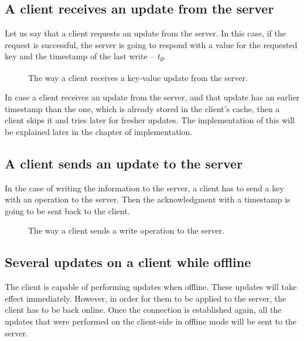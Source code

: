 \subsection{A client receives an update from the server}

Let us say that a client requests an update from the server. In this case, if the request is successful, the server is going to respond with a value for the requested key and the timestamp of the last write -- \textit{t\textsubscript{0}}.

\begin{figure}[!htb]
    \begin{center}
    \def\svgwidth{\linewidth}
    
    \caption {The way a client receives a key-value update from the server.}
    \label{fig:design2}
\end{center}
\end{figure}

In case a client receives an update from the server, and that update has an earlier timestamp than the one, which is already stored in the client's cache, then a client skips it and tries later for fresher updates. The implementation of this will be explained later in the chapter of implementation.

\subsection{A client sends an update to the server}

In the case of writing the information to the server, a client has to send a key with an operation to the server. Then the acknowledgment with a timestamp is going to be sent back to the client.

\begin{figure}[!htb]
    \begin{center}
    \def\svgwidth{\linewidth}
    
    \caption {The way a client sends a write operation to the server.}
    \label{fig:design3}
\end{center}
\end{figure}

\subsection*{Several updates on a client while offline}

The client is capable of performing updates when offline. These updates will take effect immediately. However, in order for them to be applied to the server, the client has to be back online. Once the connection is established again, all the updates that were performed on the client-side in offline mode will be sent to the server.


